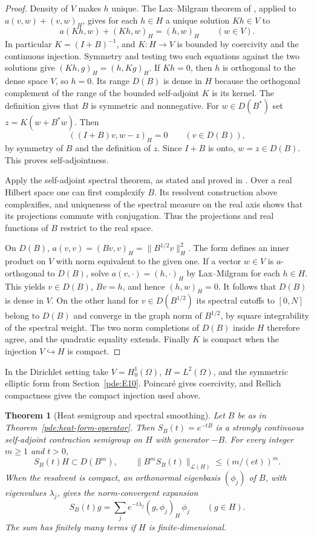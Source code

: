 \documentclass[11pt,oneside,openany]{book}
\theoremstyle{plain}
\newtheorem{theorem}{Theorem}[chapter]
\theoremstyle{definition}
\theoremstyle{remark}
\begin{document}
\begin{proof}
Density of \(V\) makes \(h\) unique. The Lax--Milgram theorem
of \cite[Chapter V03]{P106}, applied to \(a(v,w)+(v,w)_H\),
gives for each \(h\in H\) a unique solution \(Kh\in V\)
to
\[
  a(Kh,w)+(Kh,w)_H=(h,w)_H\qquad(w\in V).
\]
In particular \(K=(I+B)^{-1}\), and \(K:H\to V\) is bounded
by coercivity and the continuous injection.
Symmetry and testing two such equations against the two
solutions give \((Kh,g)_H=(h,Kg)_H\).
If \(Kh=0\), then \(h\) is orthogonal to the dense space \(V\),
so \(h=0\). Its range \(D(B)\) is dense in \(H\) because the
orthogonal complement of the range of the bounded self-adjoint
\(K\) is its kernel. The definition gives that \(B\) is
symmetric and nonnegative. For \(w\in D(B^*)\) set
\(z=K(w+B^*w)\). Then
\[
 ((I+B)v,w-z)_H=0\qquad(v\in D(B)),
\]
by symmetry of \(B\) and the definition of \(z\).
Since \(I+B\) is onto, \(w=z\in D(B)\). This proves
self-adjointness.

Apply the self-adjoint spectral theorem, as stated and proved
in \cite{D16}. Over a real Hilbert space one can first
complexify \(B\). Its resolvent construction above complexifies,
and uniqueness of the spectral measure on the real axis shows
that its projections commute with conjugation.
Thus the projections and real functions of \(B\) restrict
to the real space.

On \(D(B)\), \(a(v,v)=(Bv,v)_H=\|B^{1/2}v\|_H^2\).
The form defines an inner product on \(V\) with norm
equivalent to the given one. If a vector \(w\in V\) is
\(a\)-orthogonal to \(D(B)\), solve
\(a(v,\cdot)=(h,\cdot)_H\) by Lax--Milgram for each \(h\in H\).
This yields \(v\in D(B)\), \(Bv=h\), and hence \((h,w)_H=0\).
It follows that \(D(B)\) is dense in \(V\).
On the other hand for \(v\in D(B^{1/2})\) its spectral
cutoffs to \([0,N]\) belong to \(D(B)\) and converge in the
graph norm of \(B^{1/2}\), by square integrability of the
spectral weight. The two norm completions of \(D(B)\)
inside \(H\) therefore agree, and the quadratic equality
extends. Finally \(K\) is compact when the injection
\(V\hookrightarrow H\) is compact.
\end{proof}

In the Dirichlet setting take \(V=H^1_0(\Omega)\),
\(H=L^2(\Omega)\), and the symmetric elliptic form from
Section~\ref{pde:E10}. Poincar\'e gives coercivity, and
Rellich compactness gives the compact injection used above.

\begin{theorem}[Heat semigroup and spectral smoothing]
\label{pde:heat-dirichlet-semigroup}
Let \(B\) be as in Theorem~\ref{pde:heat-form-operator}.
Then \(S_B(t)=e^{-tB}\) is a strongly continuous
self-adjoint contraction semigroup on \(H\) with generator
\(-B\). For every integer \(m\geq1\) and \(t>0\),
\[
 S_B(t)H\subset D(B^m),\qquad
 \|B^m S_B(t)\|_{\mathcal L(H)}\leq (m/(et))^m .
\]
When the resolvent is compact, an orthonormal eigenbasis
\((\phi_j)\) of \(B\), with eigenvalues \(\lambda_j\),
gives the norm-convergent expansion
\[
 S_B(t)g=\sum_j e^{-t\lambda_j}(g,\phi_j)_H\,\phi_j
 \qquad (g\in H).
\]
The sum has finitely many terms if \(H\) is finite-dimensional.
\end{theorem}
\end{document}
